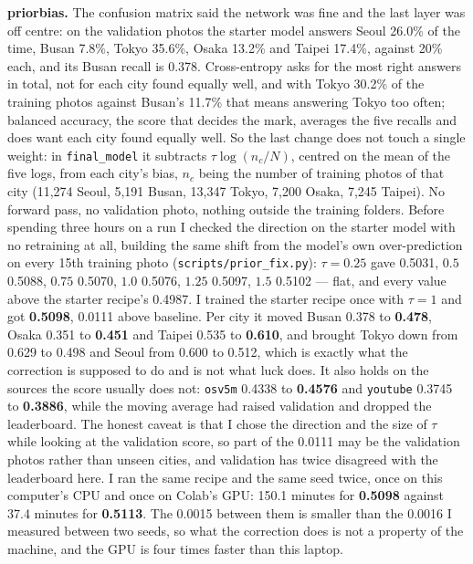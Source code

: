 \documentclass[11pt]{article}
\begin{document}
\textbf{priorbias.} The confusion matrix said the network was fine and the last
layer was off centre: on the validation photos the starter model answers Seoul
26.0\% of the time, Busan 7.8\%, Tokyo 35.6\%, Osaka 13.2\% and Taipei 17.4\%,
against 20\% each, and its Busan recall is 0.378. Cross-entropy asks for the
most right answers in total, not for each city found equally well, and with
Tokyo 30.2\% of the training photos against Busan's 11.7\% that means answering
Tokyo too often; balanced accuracy, the score that decides the mark, averages the
five recalls and does want each city found equally well. So the last change does
not touch a single weight: in \texttt{final\_model} it subtracts
$\tau \log(n_c/N)$, centred on the mean of the five logs, from each city's bias,
$n_c$ being the number of training photos of that city (11,274 Seoul, 5,191
Busan, 13,347 Tokyo, 7,200 Osaka, 7,245 Taipei). No forward pass, no validation
photo, nothing outside the training folders. Before spending three hours on a
run I checked the direction on the starter model with no retraining at all,
building the same shift from the model's own over-prediction on every 15th
training photo (\texttt{scripts/prior\_fix.py}): $\tau = 0.25$ gave 0.5031, $0.5$
0.5088, $0.75$ 0.5070, $1.0$ 0.5076, $1.25$ 0.5097, $1.5$ 0.5102 — flat, and
every value above the starter recipe's 0.4987. I trained the starter recipe once
with $\tau = 1$ and got \textbf{0.5098}, 0.0111 above baseline. Per city it moved
Busan 0.378 to \textbf{0.478}, Osaka 0.351 to \textbf{0.451} and Taipei 0.535 to
\textbf{0.610}, and brought Tokyo down from 0.629 to 0.498 and Seoul from 0.600
to 0.512, which is exactly what the correction is supposed to do and is not
what luck does. It also holds on the sources the score usually does not:
\texttt{osv5m} 0.4338 to \textbf{0.4576} and \texttt{youtube} 0.3745 to
\textbf{0.3886}, while the moving average had raised validation and dropped
the leaderboard. The honest caveat is that I chose the direction and the size of
$\tau$ while looking at the validation score, so part of the 0.0111 may be the
validation photos rather than unseen cities, and validation has twice disagreed
with the leaderboard here. I ran the same recipe and the same seed twice, once
on this computer's CPU and once on Colab's GPU: 150.1 minutes for \textbf{0.5098}
against 37.4 minutes for \textbf{0.5113}. The 0.0015 between them is smaller
than the 0.0016 I measured between two seeds, so what the correction does is not
a property of the machine, and the GPU is four times faster than this laptop.
\end{document}
